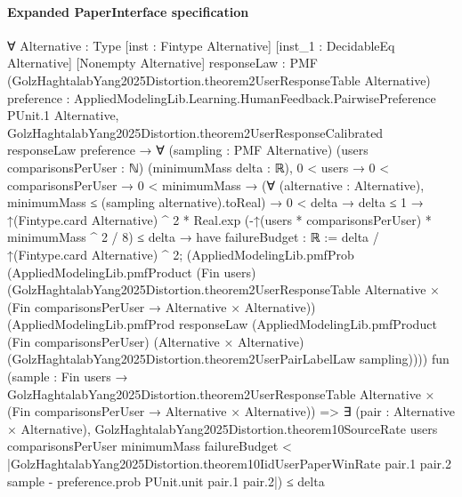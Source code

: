 \documentclass[10pt]{article}
\begin{document}
\paragraph{Expanded PaperInterface specification}
\begin{ReviewVerbatim}
∀ {Alternative : Type} [inst : Fintype Alternative] [inst_1 : DecidableEq Alternative] [Nonempty Alternative]
  {responseLaw : PMF (GolzHaghtalabYang2025Distortion.theorem2UserResponseTable Alternative)}
  {preference : AppliedModelingLib.Learning.HumanFeedback.PairwisePreference PUnit.{1} Alternative},
  GolzHaghtalabYang2025Distortion.theorem2UserResponseCalibrated responseLaw preference →
    ∀ (sampling : PMF Alternative) (users comparisonsPerUser : ℕ) (minimumMass delta : ℝ),
      0 < users →
        0 < comparisonsPerUser →
          0 < minimumMass →
            (∀ (alternative : Alternative), minimumMass ≤ (sampling alternative).toReal) →
              0 < delta →
                delta ≤ 1 →
                  ↑(Fintype.card Alternative) ^ 2 * Real.exp (-↑(users * comparisonsPerUser) * minimumMass ^ 2 / 8) ≤
                      delta →
                    have failureBudget : ℝ := delta / ↑(Fintype.card Alternative) ^ 2;
                    (AppliedModelingLib.pmfProb
                        (AppliedModelingLib.pmfProduct (Fin users)
                          (GolzHaghtalabYang2025Distortion.theorem2UserResponseTable Alternative ×
                            (Fin comparisonsPerUser → Alternative × Alternative))
                          (AppliedModelingLib.pmfProd responseLaw
                            (AppliedModelingLib.pmfProduct (Fin comparisonsPerUser) (Alternative × Alternative)
                              (GolzHaghtalabYang2025Distortion.theorem2UserPairLabelLaw sampling))))
                        fun
                          (sample :
                            Fin users →
                              GolzHaghtalabYang2025Distortion.theorem2UserResponseTable Alternative ×
                                (Fin comparisonsPerUser → Alternative × Alternative)) =>
                        ∃ (pair : Alternative × Alternative),
                          GolzHaghtalabYang2025Distortion.theorem10SourceRate users comparisonsPerUser minimumMass
                              failureBudget <
                            |GolzHaghtalabYang2025Distortion.theorem10IidUserPaperWinRate pair.1 pair.2 sample -
                                preference.prob PUnit.unit pair.1 pair.2|) ≤
                      delta
\end{ReviewVerbatim}
\end{document}
